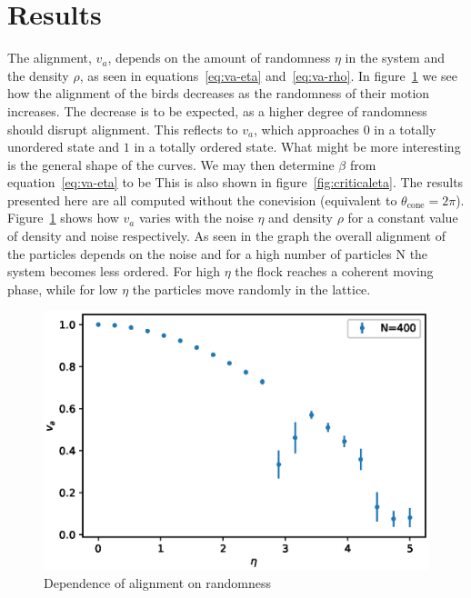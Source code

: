 \documentclass[twoside,twocolumn]{article}
\begin{document}
\section{Results}

The alignment, $v_a$, depends on the amount of randomness $\eta$ in the system 
and the density $\rho$, as seen in equations~\eqref{eq:va-eta} and~\eqref{eq:va-rho}.
In figure~\ref{fig:va_over_eta} we see how the alignment of 
the birds decreases as the randomness of their motion increases. The decrease 
is to be expected, as a higher degree of randomness should disrupt alignment. 
This reflects to $v_a$, which approaches $0$ in a totally unordered state and $1$
in a totally ordered state.
What might be more interesting is the general shape of the curves. We may then 
determine $\beta$ from equation~\eqref{eq:va-eta} to be 
This is also shown in figure~\ref{fig:criticaleta}. The results presented here 
are all computed without the conevision (equivalent to $\theta_{\text{cone}} = 2\pi$). 
Figure~\ref{fig:va_over_eta} shows how $v_a$ varies with the noise $\eta$ and 
density $\rho$ for a constant value of density and noise respectively.
As seen in the graph the overall alignment of the particles depends 
on the noise and for a high number of particles N the system becomes less ordered. 
For high $\eta$ the flock reaches a coherent moving phase, while for low $\eta$ 
the particles move randomly in the lattice.  


\begin{figure}[!htb]
  \centering
  \includegraphics[width=\columnwidth]{va_over_eta}
  \caption{Dependence of alignment on randomness}\label{fig:va_over_eta}
\end{figure}
\end{document}
